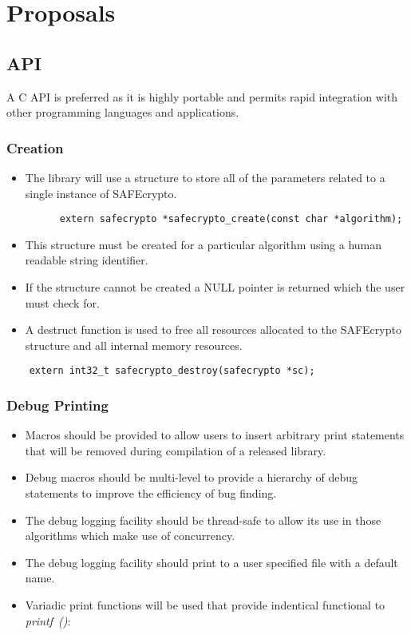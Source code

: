 \chapter{Proposals}
\label{ch_proposals}

\section{API}

A C API is preferred as it is highly portable and permits rapid integration with other programming languages and applications.


\subsection{Creation}

\begin{itemize}
\item The library will use a structure to store all of the parameters related to a single instance of SAFEcrypto.

\begin{verbatim}
      extern safecrypto *safecrypto_create(const char *algorithm);
\end{verbatim}

\item This structure must be created for a particular algorithm using a human readable string identifier.
\item If the structure cannot be created a NULL pointer is returned which the user must check for.
\item A destruct function is used to free all resources allocated to the SAFEcrypto structure and all internal memory resources.
\end{itemize}

\begin{verbatim}
    extern int32_t safecrypto_destroy(safecrypto *sc);
\end{verbatim}


\subsection{Debug Printing}

\begin{itemize}
\item Macros should be provided to allow users to insert arbitrary print statements that will be removed during compilation of a released library.
\item Debug macros should be multi-level to provide a hierarchy of debug statements to improve the efficiency of bug finding.
\item The debug logging facility should be thread-safe to allow its use in those algorithms which make use of concurrency.
\item The debug logging facility should print to a user specified file with a default name.
\item Variadic print functions will be used that provide indentical functional to \textit{printf~()}:
\end{itemize}

